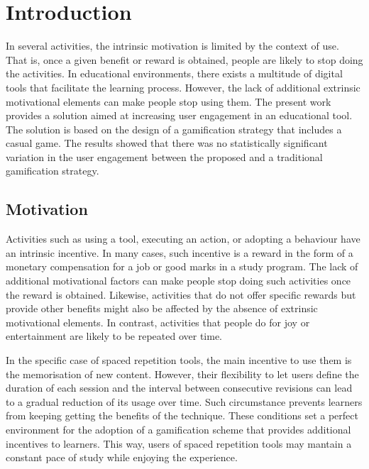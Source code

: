 
\chapter{Introduction} %

\label{intro} %


In several activities, the intrinsic motivation is limited by the context of use. That is, once a given benefit or reward is obtained, people are likely to stop doing the activities. In educational environments, there exists a multitude of digital tools that facilitate the learning process. However, the lack of additional extrinsic motivational elements can make people stop using them. The present work provides a solution aimed at increasing user engagement in an educational tool. The solution is based on the design of a gamification strategy that includes a casual game. The results showed that there was no statistically significant variation in the user engagement between the proposed and a traditional gamification strategy.

\section{Motivation}
Activities such as using a tool, executing an action, or adopting a behaviour have an intrinsic incentive. In many cases, such incentive is a reward in the form of a monetary compensation for a job or good marks in a study program. The lack of additional motivational factors can make people stop doing such activities once the reward is obtained. Likewise, activities that do not offer specific rewards but provide other benefits might also be affected by the absence of extrinsic motivational elements. In contrast, activities that people do for joy or entertainment are likely to be repeated over time.

In the specific case of spaced repetition tools, the main incentive to use them is the memorisation of new content. However, their flexibility to let users define the duration of each session and the interval between consecutive revisions can lead to a gradual reduction of its usage over time. Such circumstance prevents learners from keeping getting the benefits of the technique. These conditions set a perfect environment for the adoption of a gamification scheme that provides additional incentives to learners. This way, users of spaced repetition tools may mantain a constant pace of study while enjoying the experience.

